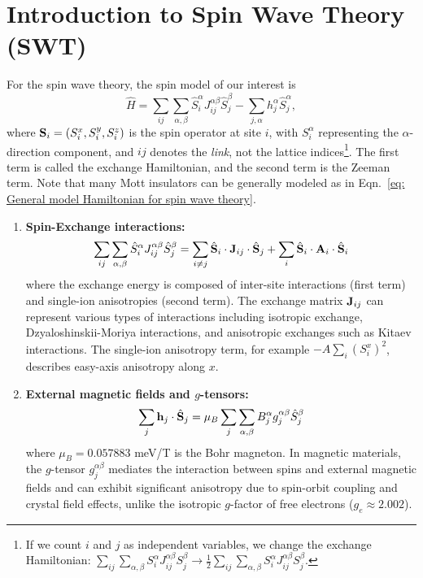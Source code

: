 \section{Introduction to Spin Wave Theory (SWT)}

For the spin wave theory, the spin model of our interest is 
\begin{equation}\label{eq: General model Hamiltonian for spin wave theory}
    \hat{H} 
    = \sum_{ij} \sum_{\alpha, \beta} \hat{S}^{\alpha}_{i} J_{ij}^{\alpha\beta}  \hat{S}^{\beta}_{j}  
    -  \sum_{j, \alpha} h_{j}^{\alpha} \hat{S}^{\alpha}_{j},
\end{equation}
where ${\bf S}_{i} = (S^{x}_{i}, S^{y}_{i}, S_{i}^{z})$ is the spin operator at site $i$, with $S^\alpha_i$ representing the $\alpha$-direction component, and $ij$ denotes the \emph{link}, not the lattice indices\footnote{
    If we count $i$ and $j$ as independent variables, we change the exchange Hamiltonian: $\sum_{ij} \sum_{\alpha, \beta} S^{\alpha}_{i} J_{ij}^{\alpha\beta}  S^{\beta}_{j} \rightarrow \frac{1}{2} \sum_{ij} \sum_{\alpha, \beta} S^{\alpha}_{i} J_{ij}^{\alpha\beta} S^{\beta}_{j}$.
}.
The first term is called the exchange Hamiltonian, and the second term is the Zeeman term. 
Note that many Mott insulators can be generally modeled as in Eqn.~\eqref{eq: General model Hamiltonian for spin wave theory}.
\begin{enumerate}[label=(\roman*)]
    \item {\bf Spin-Exchange interactions:} 
    \begin{equation}
        \sum_{ij} \sum_{\alpha, \beta} \hat{S}^{\alpha}_{i} J_{ij}^{\alpha\beta}  \hat{S}^{\beta}_{j}  
        = \sum_{i \neq j} \hat{\bf S}_{i} \cdot {\bf J}_{ij} \cdot \hat{\bf S}_{j} + \sum_{i} \hat{\bf S}_{i} \cdot {\bf A}_{i} \cdot \hat{\bf S}_{i}
    \end{equation}
    where the exchange energy is composed of inter-site interactions (first term) and single-ion anisotropies (second term). The exchange matrix ${\bf J}_{ij}$ can represent various types of interactions including isotropic exchange, Dzyaloshinskii-Moriya interactions, and anisotropic exchanges such as Kitaev interactions. The single-ion anisotropy term, for example $- A \sum_{i} (S^{x}_{i})^{2}$, describes easy-axis anisotropy along $x$.
    
    \item {\bf External magnetic fields and $g$-tensors:}
    \begin{equation}
        \sum_{j} {\bf h}_{j} \cdot \hat{\bf S}_{j} = \mu_B \sum_{j} \sum_{\alpha, \beta} B_{j}^{\alpha} g_{j}^{\alpha\beta} \hat{S}^{\beta}_{j}
    \end{equation}
    where $\mu_B = 0.057883$ meV/T is the Bohr magneton. In magnetic materials, the $g$-tensor $g_{j}^{\alpha\beta}$ mediates the interaction between spins and external magnetic fields and can exhibit significant anisotropy due to spin-orbit coupling and crystal field effects, unlike the isotropic $g$-factor of free electrons ($g_e \approx 2.002$).
\end{enumerate}

